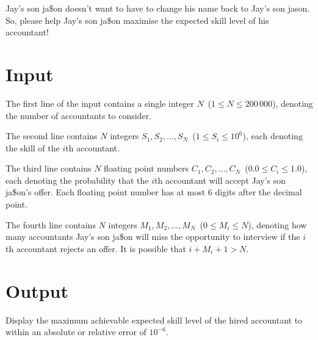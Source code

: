 Jay's son ja\$on doesn't want to have to change his name back to Jay's son
jason. So, please help Jay's son ja\$on maximise the expected skill
level of his accountant!


\section*{Input}

The first line of the input contains a single integer $N$~($1 \leq N \le 200\,000$),
denoting the number of accountants to consider.

The second line contains $N$ integers $S_1, S_2, \ldots, S_N$~($1 \leq S_i \leq 10^6$),
each denoting the skill of the $i$th accountant.

The third line contains $N$ floating point numbers $C_1, C_2, \ldots, C_N$~($0.0
\leq C_i \leq 1.0$), each denoting the probability that the $i$th accountant will accept Jay's son ja\$on's
offer. Each floating point number has at most 6 digits after the decimal point.

The fourth line contains $N$ integers $M_1, M_2, \ldots, M_N$~($0 \leq M_i \leq N$),
denoting how many accountants Jay's son ja\$on will miss the opportunity to
interview if the $i$th accountant rejects an offer. It is possible that $i+M_i+1 > N$.


\section*{Output}

Display the maximum achievable expected skill level of the hired accountant to within an absolute or relative error of $10^{-6}$.
